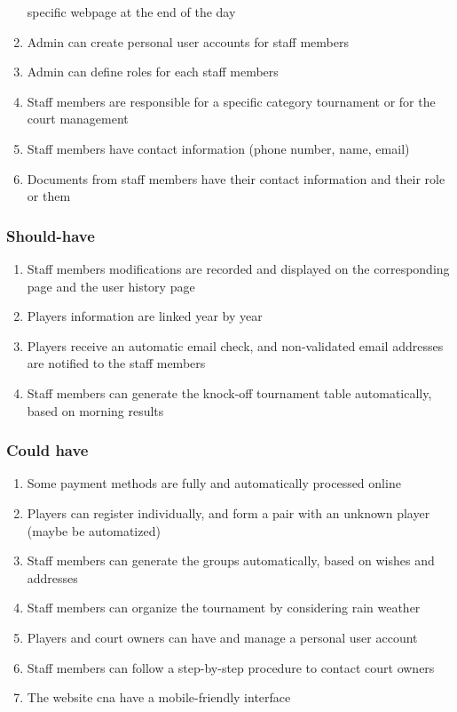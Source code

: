 \begin{enumerate}
        specific webpage at the end of the day
    \item Admin can create personal user accounts for staff members
    \item Admin can define roles for each staff members
    \item Staff members are responsible for a specific category
        tournament or for the court management 
    \item Staff members have contact information (phone number, name,
        email)
    \item Documents from staff members have their contact information
        and their role or them
\end{enumerate}

\subsubsection{Should-have}

\begin{enumerate}
    \item Staff members modifications are recorded and displayed on the
        corresponding page and the user history page
    \item Players information are linked year by year
    \item Players receive an automatic email check, and non-validated
        email addresses are notified to the staff members
    \item Staff members can generate the knock-off tournament table
        automatically, based on morning results
\end{enumerate}

\subsubsection{Could have}

\begin{enumerate}
    \item Some payment methods are fully and automatically processed
        online
    \item Players can register individually, and form a pair with an
        unknown player (maybe be automatized)
    \item Staff members can generate the groups automatically, based on
        wishes and addresses
    \item Staff members can organize the tournament by considering rain
        weather
    \item Players and court owners can have and manage a personal user
        account
    \item Staff members can follow a step-by-step procedure to contact
        court owners
    \item The website cna have a mobile-friendly interface
\end{enumerate}

